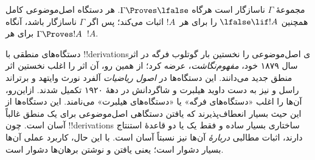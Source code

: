 \documentclass[../../../include/open-logic-section]{subfiles}
\begin{document}
مجموعهٔ $\Gamma$ ناسازگار است هرگاه $\Gamma \Proves \lfalse$. هر دستگاه
اصل‌موضوعی کامل همچنین $\lfalse \lif !A$ را برای هر~$!A$ اثبات می‌کند؛
پس اگر $\Gamma$ ناسازگار باشد، آنگاه $\Gamma \Proves !A$ برای هر~$!A$.

دستگاه‌های منطقی با !!{derivation}sی اصل‌موضوعی را نخستین بار گوتلوب فرگه
در اثر سال ۱۸۷۹ خود، \emph{مفهوم‌نگاشت}، عرضه کرد؛ از همین رو، آن اثر را
اغلب نخستین اثر منطق جدید می‌دانند. این دستگاه‌ها در
\emph{اصول ریاضیات} آلفرد نورث وایتهد و برتراند راسل و نیز به دست
داوید هیلبرت و شاگردانش در دههٔ ۱۹۲۰ تکمیل شدند. ازاین‌رو، آن‌ها را اغلب
«دستگاه‌های فرگه» یا «دستگاه‌های هیلبرت» می‌نامند. این دستگاه‌ها از این
حیث بسیار انعطاف‌پذیرند که یافتن دستگاهی اصل‌موضوعی برای یک منطق غالباً
آسان است. چون !!{derivation}s ساختاری بسیار ساده و فقط یک یا دو قاعدهٔ
استنتاج دارند، اثبات مطالبی \emph{دربارهٔ} آن‌ها نیز نسبتاً آسان است.
با این حال، کاربرد عملی آن‌ها بسیار دشوار است؛ یعنی یافتن و نوشتن
برهان‌ها دشوار است.
\end{document}
